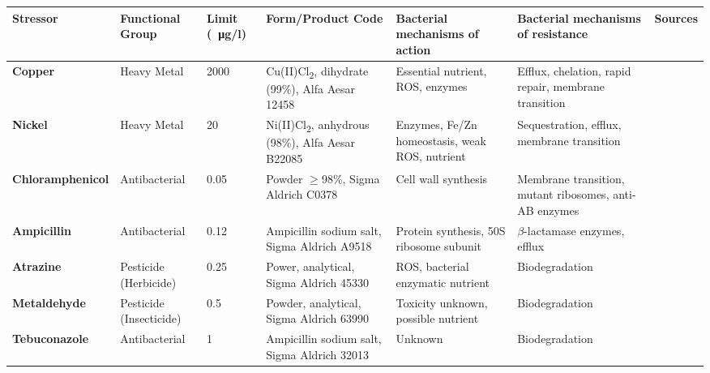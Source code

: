 \documentclass[final,1p,times]{elsarticle}
\begin{document}

\begin{landscape}
\begin{table}[ht]
\begin{threeparttable}
\small
\setlength{\tabcolsep}{4pt}
\setlength{\extrarowheight}{3pt}
\begin{tabular}{l M l M L L c}
\toprule
\textbf{Stressor} & \textbf{Functional Group} & \textbf{Limit (\SI{}{\ug}/l}) & \textbf{Form/Product Code} & \textbf{Bacterial mechanisms of action} & \textbf{Bacterial mechanisms of resistance} & \textbf{Sources} \\
\midrule
{}\textbf{Copper} & Heavy Metal & 2000 & Cu(II)Cl\textsubscript{2}, dihydrate (99\%), Alfa Aesar 12458 & Essential nutrient, ROS, enzymes & Efflux, chelation, rapid repair, membrane transition & \cite{Nayar2004EnvironmentalMesocosms,Valko2005,Dupont2011,ECHA2018Cu} \\
\textbf{Nickel} & Heavy Metal & 20 & Ni(II)Cl\textsubscript{2}, anhydrous (98\%), Alfa Aesar B22085 & Enzymes, Fe/Zn homeostasis, weak ROS, nutrient & Sequestration, efflux, membrane transition & \cite{Nayar2004EnvironmentalMesocosms,Macomber2011,Nishimura1998,Zamble2015} \\
\textbf{Chloramphenicol} & Antibacterial & 0.05 & Powder $\geqslant$98\%, Sigma Aldrich C0378 & Cell wall synthesis & Membrane transition, mutant ribosomes, anti-AB enzymes & \cite{Shaw1979,Rebstock1949,Toku-E2018Ch,Ruiz1999MechanismsFish} \\
\textbf{Ampicillin} & Antibacterial & 0.12 & Ampicillin sodium salt, Sigma Aldrich A9518 & Protein synthesis, 50S ribosome subunit & $\beta$-lactamase enzymes, efflux & \cite{Ruiz1999MechanismsFish,Costanzo2005} \\
\textbf{Atrazine} & Pesticide (Herbicide) & 0.25 & Power, analytical, Sigma Aldrich 45330 & ROS, bacterial enzymatic nutrient & Biodegradation & \cite{Shimabukuro1969,Delorenzo2001,Zhang2012} \\
\textbf{Metaldehyde} & Pesticide \break (Insecticide) & 0.5 & Powder, analytical, Sigma Aldrich 63990 & Toxicity unknown, possible nutrient & Biodegradation & \cite{Kay2014,Castle2017,Thomas2017} \\
\textbf{Tebuconazole} & Antibacterial & 1 & Ampicillin sodium salt, Sigma Aldrich 32013 & Unknown & Biodegradation & \cite{Sehnem2010,Artigas2014ComparativeEcosystems} \\

\end{tabular}
\end{threeparttable}
\end{table}
\end{landscape}
\end{document}
